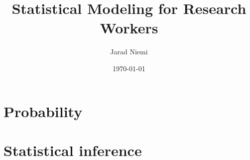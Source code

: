 \documentclass{book}
\title{Statistical Modeling for Research Workers}
\author{Jarad Niemi}
\date{\today}
\theoremstyle{definition}
\begin{document}
\maketitle
\newpage

\part{Probability}
% 

\newpage
\part{Statistical inference}



\end{document}
